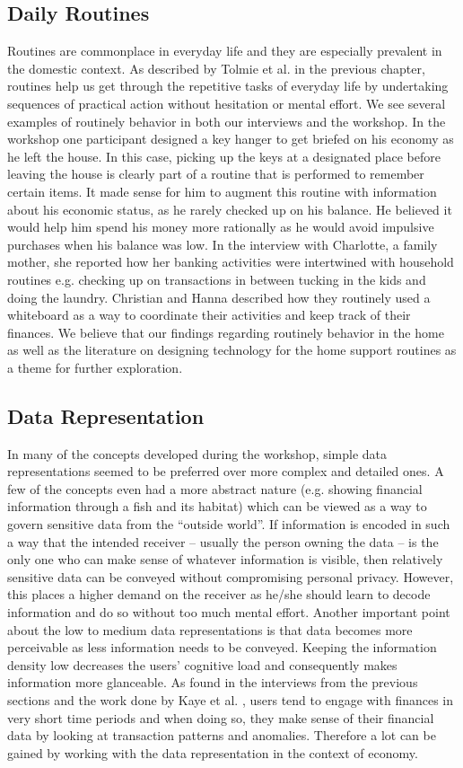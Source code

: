 \subsection{Daily Routines}
Routines are commonplace in everyday life and they are especially prevalent in the domestic context. As described by Tolmie et al. \cite{tolmie2002unremarkable} in the previous chapter, routines help us get through the repetitive tasks of everyday life by undertaking sequences of practical action without hesitation or mental effort. We see several examples of routinely behavior in both our interviews and the workshop. In the workshop one participant designed a key hanger to get briefed on his economy as he left the house. In this case, picking up the keys at a designated place before leaving the house is clearly part of a routine that is performed to remember certain items. It made sense for him to augment this routine with information about his economic status, as he rarely checked up on his balance. He believed it would help him spend his money more rationally as he would avoid impulsive purchases when his balance was low. In the interview with Charlotte, a family mother, she reported how her banking activities were intertwined with household routines e.g. checking up on transactions in between tucking in the kids and doing the laundry. Christian and Hanna described how they routinely used a whiteboard as a way to coordinate their activities and keep track of their finances. We believe that our findings regarding routinely behavior in the home as well as the literature on designing technology for the home support routines as a theme for further exploration.

\subsection{Data Representation}
In many of the concepts developed during the workshop, simple data representations seemed to be preferred over more complex and detailed ones. A few of the concepts even had a more abstract nature (e.g. showing financial information through a fish and its habitat) which can be viewed as a way to govern sensitive data from the “outside world”. If information is encoded in such a way that the intended receiver -- usually the person owning the data -- is the only one who can make sense of whatever information is visible, then relatively sensitive data can be conveyed without compromising personal privacy. However, this places a higher demand on the receiver as he/she should learn to decode information and do so without too much mental effort. Another important point about the low to medium data representations is that data becomes more perceivable as less information needs to be conveyed. Keeping the information density low decreases the users’ cognitive load and consequently makes information more glanceable. As found in the interviews from the previous sections and the work done by Kaye et al. \cite{kaye2014money}, users tend to engage with finances in very short time periods and when doing so, they make sense of their financial data by looking at transaction patterns and anomalies. Therefore a lot can be gained by working with the data representation in the context of economy.
